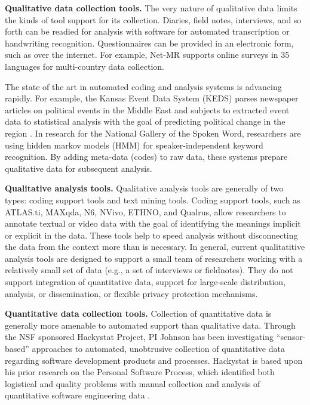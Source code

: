 {\bf Qualitative data collection tools.}  The very nature of qualitative
data limits the kinds of tool support for its collection.  Diaries, field
notes, interviews, and so forth can be readied for analysis with software
for automated transcription or handwriting recognition.  Questionnaires can
be provided in an electronic form, such as over the internet. For example,
Net-MR supports online surveys in 35 languages for multi-country data
collection.

The state of the art in automated coding and analysis systems is advancing
rapidly. For example, the Kansas Event Data System (KEDS) parses newspaper
articles on political events in the Middle East and subjects to extracted
event data to statistical analysis with the goal of predicting political
change in the region \cite{keds}. In research for the National Gallery of
the Spoken Word, researchers are using hidden markov models (HMM) for
speaker-independent keyword recognition. By adding meta-data (codes) to raw
data, these systems prepare qualitative data for subsequent analysis.

{\bf Qualitative analysis tools.} Qualitative analysis tools are generally
of two types: coding support tools and text mining tools.  Coding support
tools, such as ATLAS.ti, MAXqda, N6, NVivo, ETHNO, and Qualrus, allow
researchers to annotate textual or video data with the goal of identifying
the meanings implicit or explicit in the data. These tools help to speed
analysis without disconnecting the data from the context more than is
necessary.  In general, current qualitatitive analysis tools are designed to support a
small team of researchers working with a relatively small set of data
(e.g., a set of interviews or fieldnotes).  They do not support integration 
of quantitative data, support for large-scale distribution, analysis, or 
dissemination, or flexible privacy protection mechanisms.

{\bf Quantitative data collection tools.} Collection of quantitative data
is generally more amenable to automated support than qualitative data.
Through the NSF sponsored Hackystat Project, PI Johnson has been
investigating ``sensor-based'' approaches to automated, unobtrusive
collection of quantitative data regarding software development products and
processes.  Hackystat is based upon his prior research on the Personal
Software Process, which identified both logistical and quality problems
with manual collection and analysis of quantitative software engineering
data \cite{csdl2-01-12,csdl2-02-07}.

